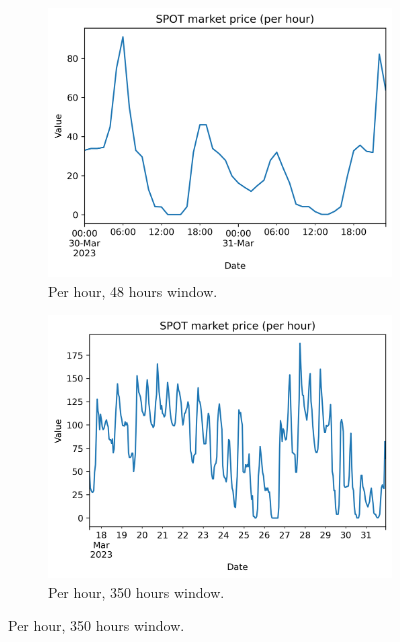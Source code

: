 \begin{figure}[H]
\centering
    \begin{subfigure}{.45\textwidth}
        \centering
        \includegraphics[width=1\linewidth]{images/variable_analysis/esios_spot_h_48}
        \caption{Per hour, 48 hours window.}
    \end{subfigure}
    \begin{subfigure}{.45\textwidth}
        \centering
        \includegraphics[width=1\linewidth]{images/variable_analysis/esios_spot_h_350}
        \caption{Per hour, 350 hours window.}
    \end{subfigure}
\end{figure}

